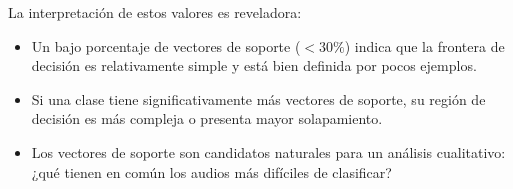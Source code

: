 La interpretación de estos valores es reveladora:
\begin{itemize}
    \item Un bajo porcentaje de vectores de soporte (\(< 30\%\)) indica que la frontera de decisión es relativamente simple y está bien definida por pocos ejemplos.
    \item Si una clase tiene significativamente más vectores de soporte, su región de decisión es más compleja o presenta mayor solapamiento.
    \item Los vectores de soporte son candidatos naturales para un análisis cualitativo: ¿qué tienen en común los audios más difíciles de clasificar?
\end{itemize}
